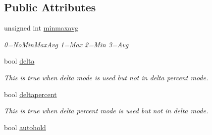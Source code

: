 \subsection*{Public Attributes}
\begin{DoxyCompactItemize}
\item 
\hypertarget{structFluke_1_1Fluke189QD0Logging_1_1modes__t_aec3dfcfd1fab721574a0fe730a5e1646}{
unsigned int \hyperlink{structFluke_1_1Fluke189QD0Logging_1_1modes__t_aec3dfcfd1fab721574a0fe730a5e1646}{minmaxavg}}
\label{structFluke_1_1Fluke189QD0Logging_1_1modes__t_aec3dfcfd1fab721574a0fe730a5e1646}

\begin{DoxyCompactList}\small\item\em 0=NoMinMaxAvg 1=Max 2=Min 3=Avg \item\end{DoxyCompactList}\item 
\hypertarget{structFluke_1_1Fluke189QD0Logging_1_1modes__t_aab48481e59dd89ef1ce2e40a935f6e7c}{
bool \hyperlink{structFluke_1_1Fluke189QD0Logging_1_1modes__t_aab48481e59dd89ef1ce2e40a935f6e7c}{delta}}
\label{structFluke_1_1Fluke189QD0Logging_1_1modes__t_aab48481e59dd89ef1ce2e40a935f6e7c}

\begin{DoxyCompactList}\small\item\em This is true when delta mode is used but not in delta percent mode. \item\end{DoxyCompactList}\item 
\hypertarget{structFluke_1_1Fluke189QD0Logging_1_1modes__t_a1f00c55b1cb3b81398e75039114d5383}{
bool \hyperlink{structFluke_1_1Fluke189QD0Logging_1_1modes__t_a1f00c55b1cb3b81398e75039114d5383}{deltapercent}}
\label{structFluke_1_1Fluke189QD0Logging_1_1modes__t_a1f00c55b1cb3b81398e75039114d5383}

\begin{DoxyCompactList}\small\item\em This is true when delta percent mode is used but not in delta mode. \item\end{DoxyCompactList}\item 
\hypertarget{structFluke_1_1Fluke189QD0Logging_1_1modes__t_a594d6d91e3f12f14c212cbb3e3de6b11}{
bool \hyperlink{structFluke_1_1Fluke189QD0Logging_1_1modes__t_a594d6d91e3f12f14c212cbb3e3de6b11}{autohold}}
\label{structFluke_1_1Fluke189QD0Logging_1_1modes__t_a594d6d91e3f12f14c212cbb3e3de6b11}


\end{DoxyCompactItemize}

